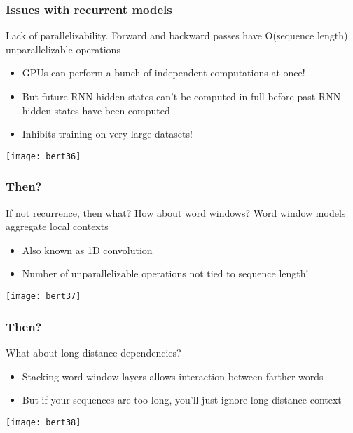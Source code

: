 \begin{frame}[fragile]\frametitle{Issues with recurrent models}

Lack of parallelizability. Forward and backward passes have O(sequence length) unparallelizable operations

\begin{itemize}
\item GPUs can perform a bunch of independent computations at once!
\item But future RNN hidden states can’t be computed in full before past RNN
hidden states have been computed
\item Inhibits training on very large datasets!
\end{itemize}	 

\begin{center}
\texttt{[image: bert36]}
\end{center}	

 
\end{frame}

\begin{frame}[fragile]\frametitle{Then?}

If not recurrence, then what? How about word windows? Word window models aggregate local contexts

\begin{itemize}
\item Also known as 1D convolution
\item Number of unparallelizable operations not tied to sequence length!
\end{itemize}	 

\begin{center}
\texttt{[image: bert37]}
\end{center}	

 
\end{frame}

\begin{frame}[fragile]\frametitle{Then?}

What about long-distance dependencies?

\begin{itemize}
\item Stacking word window layers allows interaction between farther words
\item But if your sequences are too long, you’ll just ignore long-distance context

\end{itemize}	 

\begin{center}
\texttt{[image: bert38]}
\end{center}	

 
\end{frame}

